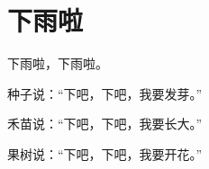 \documentclass[12pt,UTF-8,openany]{ctexbook}
\begin{document}
\clearpage

\begin{center}
    
\end{center}


\hanzibox{}\hanzibox{}\hanzibox{}\hanzibox{}\hspace{1em}\hanzibox{}\hanzibox{}\hanzibox{}\hanzibox{}

\hanzibox{}\hanzibox{}\hanzibox{}\hanzibox{}\hspace{1em}\hanzibox{}\hanzibox{}\hanzibox{}\hanzibox{}

\hanzibox{}\hanzibox{}\hanzibox{}\hanzibox{}\hspace{1em}\hanzibox{}\hanzibox{}\hanzibox{}\hanzibox{}

\hanzibox{}\hanzibox{}\hanzibox{}\hanzibox{}\hspace{1em}




\chapter{下雨啦}

\begin{large}
    
    下雨啦，下雨啦。
    
    种子说：“下吧，下吧，我要发芽。”
    
    禾苗说：“下吧，下吧，我要长大。”
    
    果树说：“下吧，下吧，我要开花。”
    
\end{large}


\clearpage

\begin{center}
    
\end{center}


\hanzibox{}\hanzibox{}\hanzibox{}\hanzibox{}\hspace{1em}\hanzibox{}\hanzibox{}\hanzibox{}\hanzibox{}

\hanzibox{}\hanzibox{}\hanzibox{}\hanzibox{}\hspace{1em}\hanzibox{}\hanzibox{}\hanzibox{}\hanzibox{}
\end{document}
